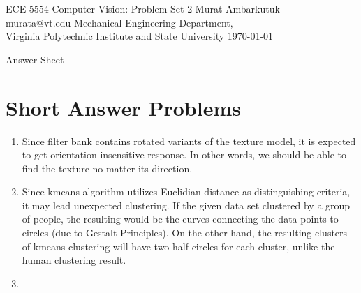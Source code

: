 \documentclass{article}
\begin{document}
\label{Cover}
	\begin{center}
	\large{ECE-5554 Computer Vision: Problem Set 2} 
	\vfill
	Murat Ambarkutuk \\ murata@vt.edu
	\vfill
	Mechanical Engineering Department,\\ Virginia Polytechnic Institute and State University
	\vfill
	\today
	\end{center}
\pagebreak 
\large{Answer Sheet}

\label{Short Answer Problems}
\section{Short Answer Problems}
\begin{enumerate}
	\item Since filter bank contains rotated variants of the texture model, it is
	expected to get orientation insensitive response. In other words, we should be
	able to find the texture no matter its direction.
	\item 
	Since kmeans algorithm utilizes Euclidian distance as
	distinguishing criteria, it may lead unexpected clustering. If the
	given data set clustered by a group of people, the resulting would be the
	curves connecting the data points to circles (due to Gestalt Principles).
	On the other hand, the resulting clusters of kmeans clustering will have two
	half circles for each cluster, unlike the human clustering result.
	\item

\end{enumerate}
\end{document}
